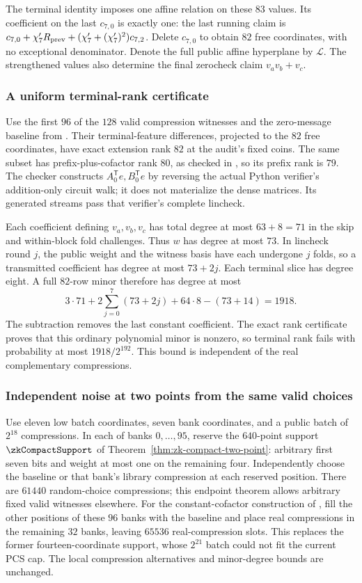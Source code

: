 The terminal identity imposes one affine relation on these $83$ values. Its coefficient on the last $c_{7,0}$ is exactly one: the last running claim is $c_{7,0}+\chi'_7 R_{\rm prev}+(\chi'_7+(\chi'_7)^2)c_{7,2}$. Delete $c_{7,0}$ to obtain $82$ free coordinates, with no exceptional denominator. Denote the full public affine hyperplane by $\mathcal L$. The strengthened values also determine the final zerocheck claim $v_av_b+v_c$.

\subsubsection{A uniform terminal-rank certificate}

Use the first $96$ of the $128$ valid compression witnesses and the zero-message baseline from . Their terminal-feature differences, projected to the $82$ free coordinates, have exact extension rank $82$ at the audit's fixed coins. The same subset has prefix-plus-cofactor rank $80$, as checked in , so its prefix rank is $79$. The checker constructs $A_0^{\mathsf T}e,B_0^{\mathsf T}e$ by reversing the actual Python verifier's addition-only circuit walk; it does not materialize the dense matrices. Its generated streams pass that verifier's complete lincheck.

Each coefficient defining $v_a,v_b,v_c$ has total degree at most $63+8=71$ in the skip and within-block fold challenges. Thus $w$ has degree at most $73$. In lincheck round $j$, the public weight and the witness basis have each undergone $j$ folds, so a transmitted coefficient has degree at most $73+2j$. Each terminal slice has degree eight. A full $82$-row minor therefore has degree at most
\[
 3\cdot71+2\sum_{j=0}^7(73+2j)+64\cdot8-(73+14)=1918.
\]
The subtraction removes the last constant coefficient. The exact rank certificate proves that this ordinary polynomial minor is nonzero, so terminal rank fails with probability at most $1918/2^{192}$. This bound is independent of the real complementary compressions.

\subsubsection{Independent noise at two points from the same valid choices}

Use eleven low batch coordinates, seven bank coordinates, and a public batch of $2^{18}$ compressions. In each of banks $0,\ldots,95$, reserve the $640$-point support $\zkCompactSupport$ of Theorem~\ref{thm:zk-compact-two-point}: arbitrary first seven bits and weight at most one on the remaining four. Independently choose the baseline or that bank's library compression at each reserved position. There are $61440$ random-choice compressions; this endpoint theorem allows arbitrary fixed valid witnesses elsewhere. For the constant-cofactor construction of , fill the other positions of these $96$ banks with the baseline and place real compressions in the remaining $32$ banks, leaving $65536$ real-compression slots. This replaces the former fourteen-coordinate support, whose $2^{21}$ batch could not fit the current PCS cap. The local compression alternatives and minor-degree bounds are unchanged.

